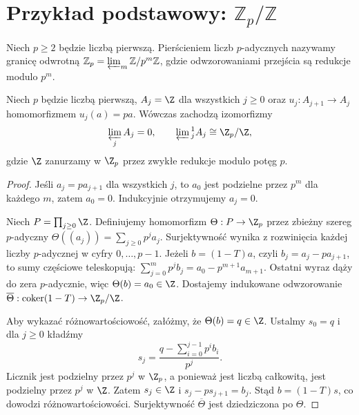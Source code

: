 \section{Przykład podstawowy: $\mathbb Z_p/\mathbb Z$}
\begin{definicja}
Niech $p\ge2$ będzie liczbą pierwszą. Pierścieniem liczb
$p$-adycznych nazywamy granicę odwrotną
$\mathbb Z_p=\varprojlim_m\mathbb Z/p^m\mathbb Z$,
gdzie odwzorowaniami przejścia są redukcje modulo $p^m$.
\end{definicja}
\begin{twierdzenie}
\label{thm:xviii-padic}
Niech $p$ będzie liczbą pierwszą,
$A_j=\Z$ dla wszystkich $j\ge0$ oraz
$u_j:A_{j+1}\to A_j$ homomorfizmem
$u_j(a)=pa$. Wówczas zachodzą
izomorfizmy
\[
\varprojlim_j A_j=0,\qquad
\varprojlim{}^1_j A_j\cong\Z_p/\Z,
\]
gdzie $\Z$ zanurzamy w $\Z_p$ przez zwykłe redukcje
modulo potęg $p$.
\end{twierdzenie}
\begin{proof}
Jeśli $a_j=pa_{j+1}$ dla wszystkich $j$, to $a_0$
jest podzielne przez $p^m$ dla każdego $m$, zatem $a_0=0$.
Indukcyjnie otrzymujemy $a_j=0$.

Niech $P=\prod_{j\ge0}\Z$. Definiujemy homomorfizm
$\Theta:P\to\Z_p$ przez zbieżny szereg $p$-adyczny
$\Theta((a_j))=\sum_{j\ge0}p^ja_j$.
Surjektywność wynika z rozwinięcia każdej liczby $p$-adycznej
w cyfry $0,\ldots,p-1$.
Jeżeli $b=(1-T)a$, czyli $b_j=a_j-pa_{j+1}$,
to sumy częściowe teleskopują:
$\sum_{j=0}^{m}p^jb_j=a_0-p^{m+1}a_{m+1}$.
Ostatni wyraz dąży do zera $p$-adycznie, więc
$\Theta(b)=a_0\in\Z$. Dostajemy indukowane odwzorowanie
$\overline\Theta:\operatorname{coker}(1-T)\to\Z_p/\Z$.

Aby wykazać różnowartościowość, załóżmy, że
$\Theta(b)=q\in\Z$. Ustalmy $s_0=q$ i dla $j\ge0$ kładźmy
\[
s_j=\frac{q-\sum_{i=0}^{j-1}p^ib_i}{p^j}.
\]
Licznik jest podzielny przez $p^j$ w $\Z_p$, a ponieważ
jest liczbą całkowitą, jest podzielny przez $p^j$ w $\Z$.
Zatem $s_j\in\Z$ i $s_j-ps_{j+1}=b_j$.
Stąd $b=(1-T)s$, co dowodzi różnowartościowości.
Surjektywność $\overline\Theta$ jest dziedziczona po $\Theta$.
\end{proof}
